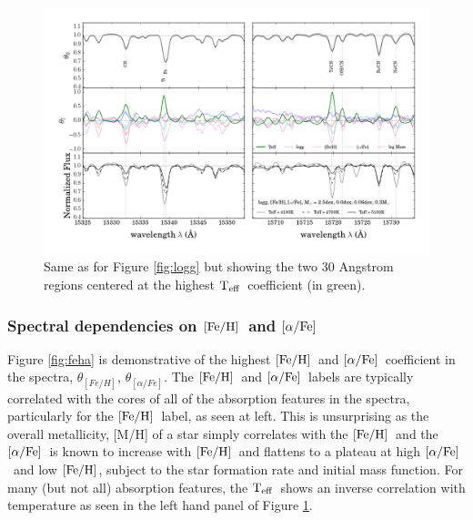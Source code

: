 \documentclass[12pt, preprint]{aastex}
\newcommand{\project}[1]{\textsl{#1}}
\newcommand{\apogee}{\project{APOGEE}}
\newcommand{\teff}{\mbox{$\rm T_{eff}$}}
\newcommand{\feh}{\mbox{$\rm [Fe/H]$}}
\newcommand{\alphafe}{\mbox{$\rm [\alpha/Fe]$}}
\begin{document}

\begin{figure}[h!]
\centering
    \includegraphics[scale=0.51]{./plots/coeffs_t_3.png}
  \caption{Same as for Figure \ref{fig:logg} but showing the two 30 Angstrom regions centered at the highest \teff\ coefficient (in green).}
\label{fig:teff}
\end{figure}



\subsubsection{Spectral dependencies on \feh\ and \alphafe} 

Figure \ref{fig:feha} is demonstrative of the highest \feh\ and \alphafe\ coefficient in the spectra, $\theta_{[Fe/H]}$, $\theta_{[\alpha/Fe]}$. The \feh\ and \alphafe\ labels are typically correlated with the cores of all of the absorption features in the spectra, particularly for the \feh\ label, as seen at left. This is unsurprising as the overall metallicity,  [M/H] of  a star simply correlates with the \feh\ and the \alphafe\ is known to increase with \feh\ and flattens to a plateau at high \alphafe\ and low \feh, subject to the star formation rate and initial mass function. For many (but not all) absorption features, the \teff\ shows an inverse correlation with temperature as seen in the left hand panel of Figure \ref{fig:teff}. 
\end{document}
